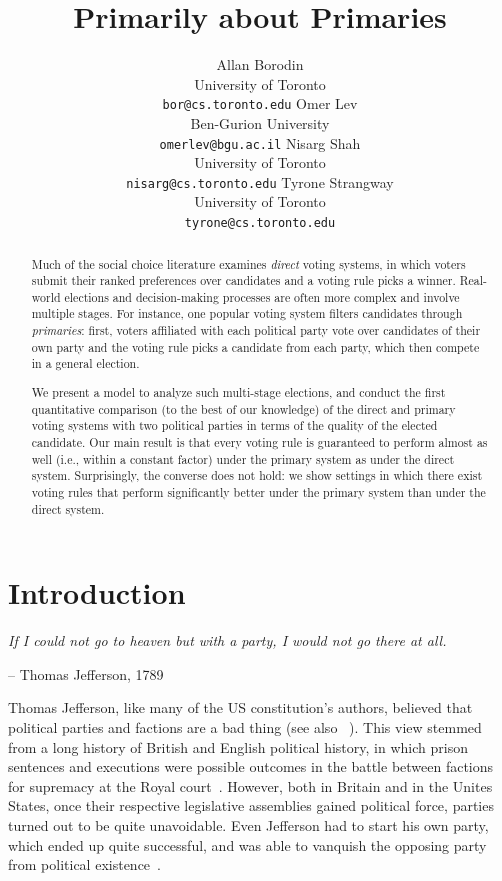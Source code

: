 \documentclass[letterpaper]{article} %
\newcommand{\citet}[1]{\citeauthor{#1}~\shortcite{#1}}
\theoremstyle{definition}
\begin{document}
\title{Primarily about Primaries}
\author{Allan Borodin\\University of Toronto\\\texttt{bor@cs.toronto.edu} \And Omer Lev\\Ben-Gurion University\\\texttt{omerlev@bgu.ac.il} \AND Nisarg Shah\\University of Toronto\\\texttt{nisarg@cs.toronto.edu} \And Tyrone Strangway\\University of Toronto\\\texttt{tyrone@cs.toronto.edu}}
\maketitle
\begin{abstract}
Much of the social choice literature examines \emph{direct} voting systems, in which voters submit their ranked preferences over candidates and a voting rule picks a winner. Real-world elections and decision-making processes are often more complex and involve multiple stages. For instance, one popular voting system filters candidates through \emph{primaries}: first, voters affiliated with each political party vote over candidates of their own party and the voting rule picks a candidate from each party, which then compete in a general election.

We present a model to analyze such multi-stage elections, and conduct the first quantitative comparison (to the best of our knowledge) of the direct and primary voting systems with two political parties in terms of the quality of the elected candidate. Our main result is that every voting rule is guaranteed to perform almost as well
(i.e., within a constant factor) under the primary system as under the direct system. Surprisingly, the converse does not hold: we show settings in which there exist voting rules that perform significantly better under the primary system than under the direct system.
\end{abstract}

\section{Introduction}

\epigraph{\emph{If I could not go to heaven but with a party, I would not go there at all.}}{-- Thomas Jefferson, 1789}

Thomas Jefferson, like many of the US constitution's authors, believed that political parties and factions are a bad thing (see also \citet{HMJ87}). This view stemmed from a long history of British and English political history, in which prison sentences and executions were possible outcomes in the battle between factions for supremacy at the Royal court~\cite{Sim07}. However, both in Britain and in the Unites States, once their respective legislative assemblies gained political force, parties turned out to be quite unavoidable. Even Jefferson had to start his own party, which ended up quite successful, and was able to vanquish the opposing party from political existence~\cite{Wil05}.
\end{document}
